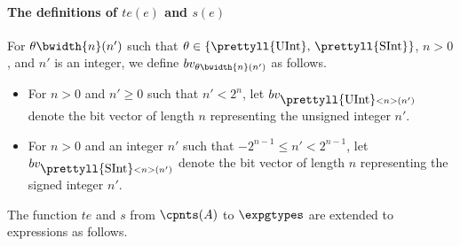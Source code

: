\paragraph*{The definitions of $te(e)$ and $s(e)$}
%
For $\theta \bwidth{n}(n')$ such that $\theta \in \{\mbox{\prettyll{UInt}, \prettyll{SInt}}\}$, $n > 0$, and $n'$ is an integer, we define $bv_{\theta \bwidth{n}(n')}$ as follows.
\begin{itemize}
\item For $n > 0$ and $n' \ge 0$ such that $n' < 2^n$, let $bv_{\mbox{\prettyll{UInt}}<n>(n')}$ denote the bit vector of length $n$ representing the unsigned integer $n'$.
%
\item For $n > 0$ and an integer $n'$ such that $-2^{n-1} \le n' < 2^{n-1}$, let $bv_{\mbox{\prettyll{SInt}}<n>(n')}$ denote the bit vector of length $n$ representing the signed integer $n'$.
\end{itemize}
The function $te$ and $s$ from $\cpnts(A)$ to $\expgtypes$ are extended to expressions as follows.
